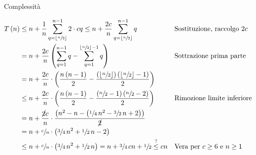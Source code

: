 \begin{frame}[shrink=5]{Complessità}




\vspace{-15pt}
\small
\begin{align*}
T\left(n\right) &\le 
n + \frac{1}{n} \sum_{q=\left\lfloor \sfrac{n}{2}\right\rfloor}^{n-1} 2 \cdot cq \leq
n + \frac{2c}{n} \sum_{q=\left\lfloor \sfrac{n}{2}\right\rfloor}^{n-1}q
&&\textrm{Sostituzione, raccolgo $2c$} \\
&= n + \frac{2c}{n} \left( \sum_{q=1}^{n-1}q - \sum_{q=1}^{\lfloor \sfrac{n}{2} \rfloor -1} q \right)&&\textrm{Sottrazione prima parte}\\
&= n + \frac{2c}{n} \cdot \left(\frac{n\left(n- 1\right)}{2} - \frac{\left(\lfloor \sfrac{n}{2}\rfloor\right)\left(\lfloor\sfrac{n}{2}\rfloor - 1\right)}{2}\right)\\
&\leq n + \frac{2c}{n} \cdot \left(\frac{n\left(n- 1\right)}{2} - \frac{\left(\sfrac{n}{2} -1\right)\left(\sfrac{n}{2} - 2\right)}{2}\right)&&\textrm{Rimozione limite inferiore}\\
&= n + \frac{\cancel{2}c}{n} \cdot \frac{\left(n^2-n - \left(\sfrac{1}{4}\,n^2 - \sfrac{3}{2}\,n + 2\right)\right)}{\cancel{2}} \\
&= n + \sfrac{c}{n} \cdot \left(\sfrac{3}{4}\,n^2+ \sfrac{1}{2}\,n-2 \right) \\
&\leq n + \sfrac{c}{n} \cdot \left(\sfrac{3}{4}\,n^2 + \sfrac{1}{2}\,n\right) = n + \sfrac{3}{4}\,cn + \sfrac{1}{2} \stackrel{?}{\leq} cn&& \textrm{Vera per $c \geq 6$ e $n \geq 1$}\\
\end{align*}


\end{frame}

